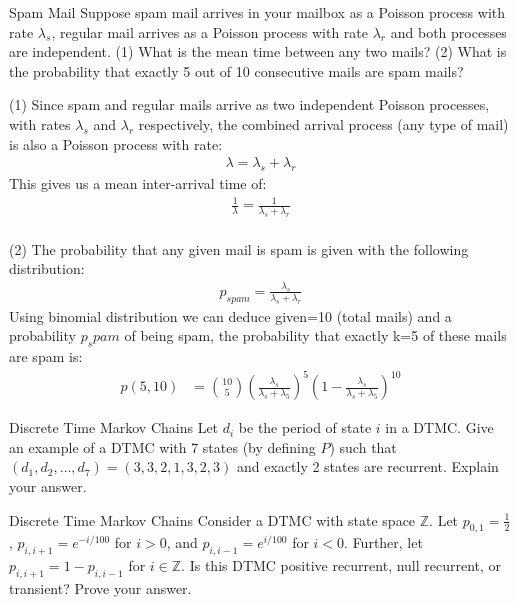 \begin{problem}{Spam Mail}
 Suppose spam mail arrives in your mailbox as a Poisson process with rate $\lambda_s$, regular mail arrives as a Poisson process with rate $\lambda_r$ and both processes are independent. (1) What is the mean time between any two mails? (2) What is the probability that exactly 5 out of 10 consecutive mails are spam mails?
 \end{problem}
 \begin{solution}
 (1) Since spam and regular mails arrive as two independent Poisson processes, with rates $\lambda_s$ and $\lambda_r$ respectively, the combined arrival process (any type of mail) is also a Poisson process with rate:
 \begin{align*}
     \lambda= \lambda_s +\lambda_r
 \end{align*}
 This gives us a mean inter-arrival time of:
 \begin{align*}
    \frac{1}{\lambda}= \frac{1}{\lambda_s +\lambda_r}
 \end{align*}
 \\
 (2) The probability that any given mail is spam is given with the following distribution:
 \begin{align*}
     p_{spam}=\frac{\lambda_s}{\lambda_s +\lambda_r}
 \end{align*}
 Using binomial distribution we can deduce given=10 (total mails) and a probability $p_spam$ of being spam, the probability that exactly k=5 of these mails are spam is:
\begin{align*}
    p(5,10)&=\binom{10}{5} \left (\frac{\lambda_s}{\lambda_s +\lambda_5}\right )^5 \left ( 1- \frac{\lambda_s}{\lambda_s +\lambda_5} \right ) ^{10}
\end{align*}
\end{solution}

\begin{problem}{Discrete Time Markov Chains} 
Let \( d_i \) be the period of state \( i \) in a DTMC. Give an example of a DTMC with 7 states (by defining \( P \)) such that \( (d_1, d_2, \dots, d_7) = (3, 3, 2, 1, 3, 2, 3) \) and exactly 2 states are recurrent. Explain your answer.
\end{problem}

\begin{problem}{Discrete Time Markov Chains}
Consider a DTMC with state space \( \mathbb{Z} \). Let \( p_{0,1} = \frac{1}{2} \), \( p_{i,i+1} = e^{-i/100} \) for \( i > 0 \), and \( p_{i,i-1} = e^{i/100} \) for \( i < 0 \). Further, let \( p_{i,i+1} = 1 - p_{i,i-1} \) for \( i \in \mathbb{Z} \). Is this DTMC positive recurrent, null recurrent, or transient? Prove your answer.
\end{problem}

